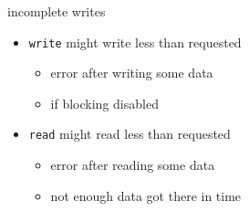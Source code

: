 \begin{frame}{incomplete writes}
\begin{itemize}
    \item \texttt{write} might write less than requested
        \begin{itemize}
        \item error after writing some data
        \item if blocking disabled
        \end{itemize}
    \item \texttt{read} might read less than requested
        \begin{itemize}
        \item error after reading some data
        \item not enough data got there in time
        \end{itemize}
\end{itemize}
\end{frame}
